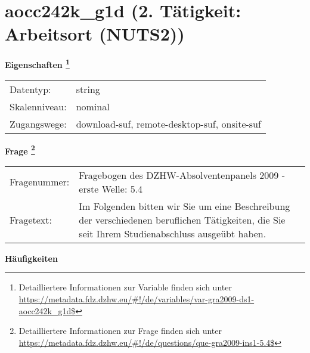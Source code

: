 
    \setcounter{footnote}{0}

    \vspace*{-1.8cm}
	\section{aocc242k\_g1d (2. Tätigkeit: Arbeitsort (NUTS2))}
	\label{section:aocc242k_g1d}



    \vspace*{0.5cm}
    \noindent\textbf{Eigenschaften
	\footnote{Detailliertere Informationen zur Variable finden sich unter
		\url{https://metadata.fdz.dzhw.eu/\#!/de/variables/var-gra2009-ds1-aocc242k_g1d$}}}\\
	\begin{tabularx}{\hsize}{@{}lX}
	Datentyp: & string \\
	Skalenniveau: & nominal \\
	Zugangswege: &
	  download-suf, 
	  remote-desktop-suf, 
	  onsite-suf
 \\
    \end{tabularx}



				\vspace*{0.5cm}
                \noindent\textbf{Frage
	                \footnote{Detailliertere Informationen zur Frage finden sich unter
		              \url{https://metadata.fdz.dzhw.eu/\#!/de/questions/que-gra2009-ins1-5.4$}}}\\
				\begin{tabularx}{\hsize}{@{}lX}
					Fragenummer: &
					  Fragebogen des DZHW-Absolventenpanels 2009 - erste Welle:
					  5.4
 \\
					Fragetext: & Im Folgenden bitten wir Sie um eine Beschreibung der verschiedenen beruflichen Tätigkeiten, die Sie seit Ihrem Studienabschluss ausgeübt haben. \\
				\end{tabularx}





        		\vspace*{0.5cm}
                \noindent\textbf{Häufigkeiten}

